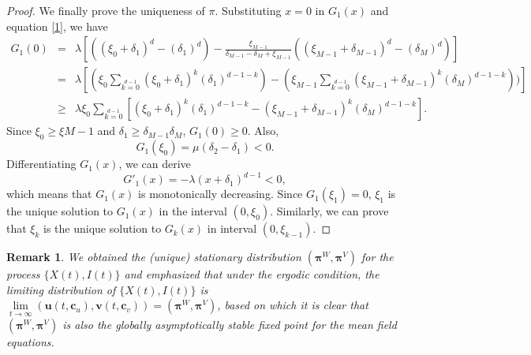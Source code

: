 \documentclass[12pt]{article}
\newtheorem{definition}{Definition}[section]
\newtheorem{remark}{Remark}[section]
\begin{document}
\begin{proof}
We finally prove the uniqueness of $\pi$.
Substituting $x=0$ in $G_1(x)$ and equation \eqref{1}, we have
\begin{eqnarray*}
  G_{1}(0)&=&\lambda\left[((\xi_0+\delta_1)^d-(\delta_1)^d)-\frac{\xi_{M-1}}{\delta_{M-1}-\delta_{M}+\xi_{M-1}}((\xi_{M-1}+\delta_{M-1})^d-(\delta_M)^d)\right]\\
         &=&\lambda[(\xi_0\sum\limits_{k=0}\limits^{d-1}(\xi_0+\delta_1)^k(\delta_1)^{d-1-k})-(\xi_{M-1}\sum\limits_{k=0}\limits^{d-1}(\xi_{M-1}+\delta_{M-1})^k(\delta_M)^{d-1-k}))]\\
         &\geq&\lambda\xi_0\sum\limits_{k=0}\limits^{d-1}[(\xi_0+\delta_1)^k(\delta_1)^{d-1-k}-(\xi_{M-1}+\delta_{M-1})^k(\delta_M)^{d-1-k}].
\end{eqnarray*}
Since $\xi_{0}\geq\xi{M-1}$ and $\delta_1\geq\delta_{M-1}\delta_{M}$, $G_1(0)\geq 0$.
Also,
\begin{equation*}
  G_1(\xi_{0})=\mu(\delta_{2}-\delta_{1})<0.
\end{equation*}
Differentiating $G_1(x)$, we can derive
\begin{equation*}
  G'_1(x)=-\lambda(x+\delta_1)^{d-1}<0,
\end{equation*}
which means that $G_1(x)$ is monotonically decreasing.
Since $G_{1}(\xi_1)=0$, $\xi_{1}$ is the unique solution to $G_1(x)$ in the interval $(0, \xi_0)$.
Similarly, we can prove that $\xi_{k}$ is the unique solution to $G_k(x)$ in interval $(0,\xi_{k-1})$.
\end{proof}

\begin{remark}
We obtained the (unique) stationary distribution $(\mathbf{\pi}^{W},\mathbf\pi^{V})$ for the process $\{X(t),I(t)\}$ and emphasized that under the ergodic condition, the limiting distribution of $\{X(t),I(t)\}$ is $\lim\limits_{t\to \infty}(\mathbf{u}(t,\mathbf{c}_u),\mathbf{v}(t,\mathbf{c}_v))=(\mathbf{\pi}^{W},\mathbf\pi^{V})$, based on which it is clear that $(\mathbf{\pi}^{W},\mathbf\pi^{V})$ is also the globally asymptotically stable fixed point for the mean field equations.
\end{remark}

\end{document}
